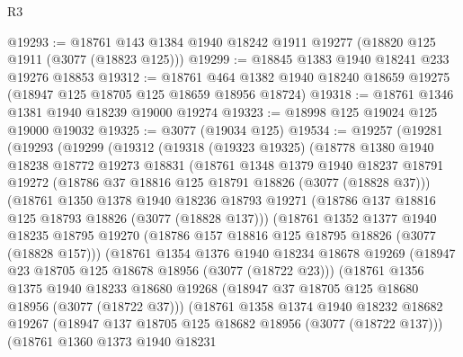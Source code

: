 \begin{lexlean}{R3}
\begin{coremodule}
@19293 := @18761 @143 @1384 @1940 @18242 @1911 @19277 (@18820 @125 @1911 (@3077 (@18823 @125)))
@19299 := @18845 @1383 @1940 @18241 @233 @19276 @18853
@19312 := @18761
    @464
    @1382
    @1940
    @18240
    @18659
    @19275
    (@18947 @125 @18705 @125 @18659 @18956 @18724)
@19318 := @18761 @1346 @1381 @1940 @18239 @19000 @19274
@19323 := @18998 @125 @19024 @125 @19000 @19032
@19325 := @3077 (@19034 @125)
@19534 := @19257
    (@19281
      (@19293
        (@19299
          (@19312
            (@19318
              (@19323 @19325)
              (@18778
                @1380
                @1940
                @18238
                @18772
                @19273
                @18831
                (@18761
                  @1348
                  @1379
                  @1940
                  @18237
                  @18791
                  @19272
                  (@18786 @37 @18816 @125 @18791 @18826 (@3077 (@18828 @37)))
                  (@18761
                    @1350
                    @1378
                    @1940
                    @18236
                    @18793
                    @19271
                    (@18786 @137 @18816 @125 @18793 @18826 (@3077 (@18828 @137)))
                    (@18761
                      @1352
                      @1377
                      @1940
                      @18235
                      @18795
                      @19270
                      (@18786 @157 @18816 @125 @18795 @18826 (@3077 (@18828 @157)))
                      (@18761
                        @1354
                        @1376
                        @1940
                        @18234
                        @18678
                        @19269
                        (@18947 @23 @18705 @125 @18678 @18956 (@3077 (@18722 @23)))
                        (@18761
                          @1356
                          @1375
                          @1940
                          @18233
                          @18680
                          @19268
                          (@18947 @37 @18705 @125 @18680 @18956 (@3077 (@18722 @37)))
                          (@18761
                            @1358
                            @1374
                            @1940
                            @18232
                            @18682
                            @19267
                            (@18947 @137 @18705 @125 @18682 @18956 (@3077 (@18722 @137)))
                            (@18761
                              @1360
                              @1373
                              @1940
                              @18231

\end{coremodule}
\end{lexlean}
